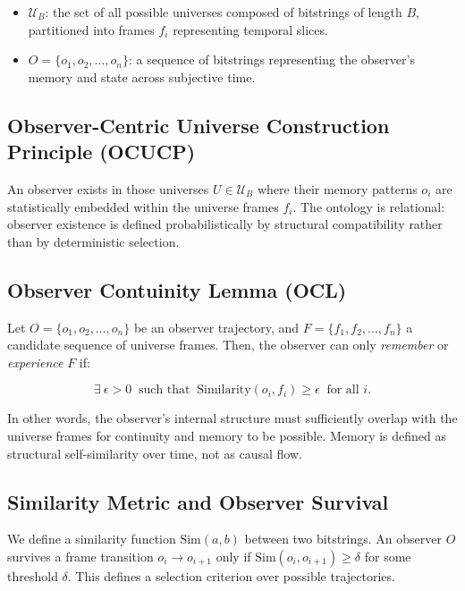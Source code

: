 \documentclass[12pt]{article}
\begin{document}
\begin{itemize}
      \item $\mathcal{U}_B$: the set of all possible universes composed of bitstrings of length $B$, partitioned into frames $f_i$ representing temporal slices.
      \item $O = \{o_1, o_2, \ldots, o_n\}$: a sequence of bitstrings representing the observer's memory and state across subjective time.
\end{itemize}

\subsection{Observer-Centric Universe Construction Principle (OCUCP)}


An observer exists in those universes $U \in \mathcal{U}_B$ where their memory patterns $o_i$ are statistically embedded within the universe frames $f_i$. The ontology is relational: observer existence is defined probabilistically by structural compatibility rather than by deterministic selection.


\subsection{Observer Contuinity Lemma (OCL)}

Let $O = \{o_1, o_2, \ldots, o_n\}$ be an observer trajectory, and $F = \{f_1, f_2, \ldots, f_n\}$ a candidate sequence of universe frames. Then, the observer can only \emph{remember} or \emph{experience} $F$ if:

\[
      \exists\ \epsilon > 0\ \text{ such that }\ \text{Similarity}(o_i, f_i) \ge \epsilon\ \text{ for all } i.
\]

In other words, the observer's internal structure must sufficiently overlap with the universe frames for continuity and memory to be possible. Memory is defined as structural self-similarity over time, not as causal flow.

\subsection{Similarity Metric and Observer Survival}

We define a similarity function $\text{Sim}(a, b)$ between two bitstrings. An observer $O$ survives a frame transition $o_i \to o_{i+1}$ only if $\text{Sim}(o_i, o_{i+1}) \ge \delta$ for some threshold $\delta$. This defines a selection criterion over possible trajectories.
\end{document}
